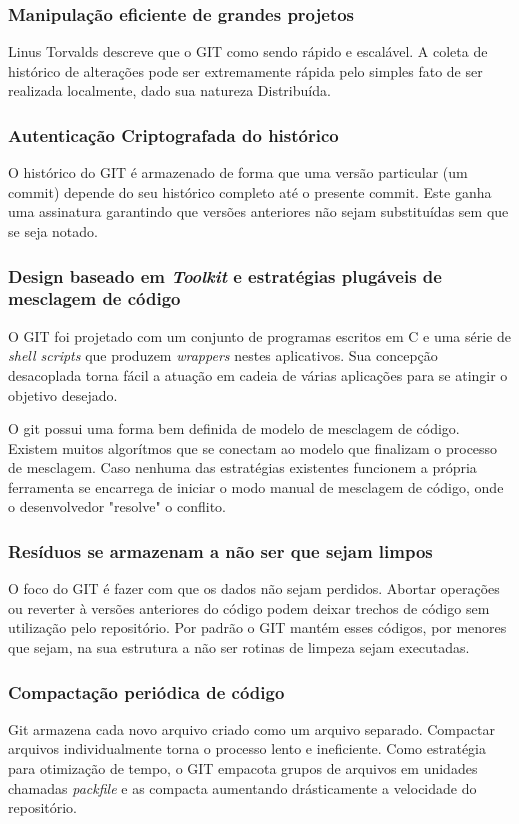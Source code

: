 \documentclass[
	article,			%
	12pt,				%
	oneside,			%
	a4paper,			%
	english,			
	brazil,
	sumario=tradicional
	]{abntex2}
\begin{document}
\subsubsection{Manipulação eficiente de grandes projetos}
Linus Torvalds descreve que o GIT como sendo rápido e escalável. A coleta de histórico de alterações pode ser extremamente rápida pelo simples fato de ser realizada localmente, dado sua natureza Distribuída.

\subsubsection{Autenticação Criptografada do histórico}
O histórico do GIT é armazenado de forma que uma versão particular (um commit) depende do seu histórico completo até o presente commit. Este ganha uma assinatura garantindo que versões anteriores não sejam substituídas sem que se seja notado.

\subsubsection{Design baseado em \textit{Toolkit} e estratégias plugáveis de mesclagem de código}
O GIT foi projetado com um conjunto de programas escritos em C e uma série de \textit{shell scripts} que produzem \textit{wrappers} nestes aplicativos. Sua concepção desacoplada torna fácil a atuação em cadeia de várias aplicações para se atingir o objetivo desejado.

O git possui uma forma bem definida de modelo de mesclagem de código. Existem muitos algorítmos que se conectam ao modelo que finalizam o processo de mesclagem. Caso nenhuma das estratégias existentes funcionem a própria ferramenta se encarrega de iniciar o modo manual de mesclagem de código, onde o desenvolvedor "resolve" o conflito.

\subsubsection{Resíduos se armazenam a não ser que sejam limpos}
O foco do GIT é fazer com que os dados não sejam perdidos. Abortar operações ou reverter à versões anteriores do código podem deixar trechos de código sem utilização pelo repositório. Por padrão o GIT mantém esses códigos, por menores que sejam, na sua estrutura a não ser rotinas de limpeza sejam executadas.

\subsubsection{Compactação periódica de código}
Git armazena cada novo arquivo criado como um arquivo separado. Compactar arquivos individualmente torna o processo lento e ineficiente. Como estratégia para otimização de tempo, o GIT empacota grupos de arquivos em unidades chamadas \textit{packfile} e as compacta aumentando drásticamente a velocidade do repositório.
\end{document}
